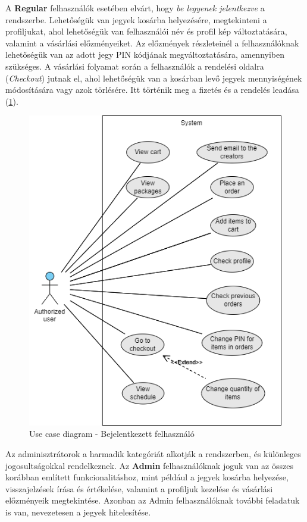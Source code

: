 \begin{itemize}
A \textbf{Regular} felhasználók esetében elvárt, hogy \textit{be legyenek jelentkezve} a rendszerbe. Lehetőségük van jegyek kosárba helyezésére, megtekinteni a profiljukat, ahol lehetőségük van felhasználói név és profil kép változtatására, valamint a vásárlási előzményeiket. Az előzmények részleteinél a felhasználóknak lehetőségük van az adott jegy PIN kódjának megváltoztatására, amennyiben szükséges. A vásárlási folyamat során a felhasználók a rendelési oldalra (\textit{Checkout}) jutnak el, ahol lehetőségük van a kosárban levő jegyek mennyiségének módosítására vagy azok törlésére. Itt történik meg a fizetés és a rendelés leadása (\ref{abra:useCaseA}).

\begin{figure}[!h]
	\centering
	\includegraphics[scale=0.7]{images/useCaseA}
	\caption{Use case diagram - Bejelentkezett felhasználó}
	\label{abra:useCaseA}
\end{figure}
\pagebreak

Az adminisztrátorok a harmadik kategóriát alkotják a rendszerben, és különleges jogosultságokkal rendelkeznek. Az \textbf{Admin} felhasználóknak joguk van az összes korábban említett funkcionalitáshoz, mint például a jegyek kosárba helyezése, visszajelzések írása és értékelése, valamint a profiljuk kezelése és vásárlási előzményeik megtekintése. Azonban az Admin felhasználóknak további feladatuk is van, nevezetesen a jegyek hitelesítése.


\end{itemize}
